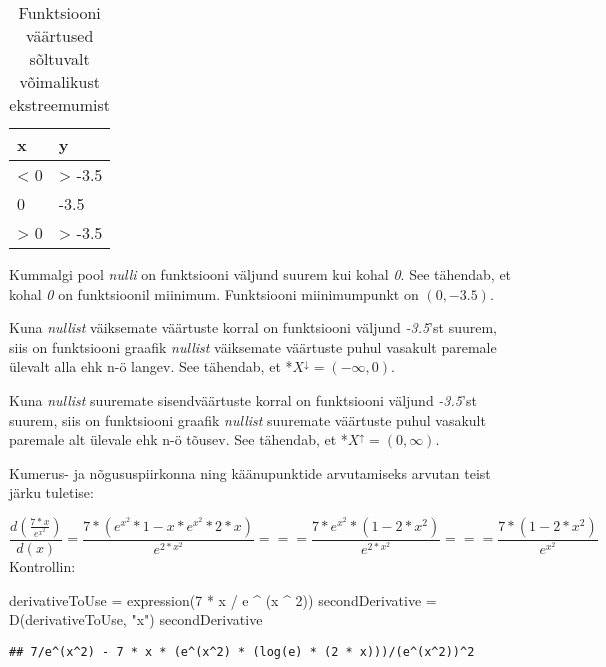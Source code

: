 \documentclass[
]{article}
\newenvironment{Shaded}{\begin{snugshade}}{\end{snugshade}}
\newcommand{\DecValTok}[1]{\textcolor[rgb]{0.00,0.00,0.81}{#1}}
\newcommand{\FunctionTok}[1]{\textcolor[rgb]{0.00,0.00,0.00}{#1}}
\newcommand{\NormalTok}[1]{#1}
\newcommand{\OtherTok}[1]{\textcolor[rgb]{0.56,0.35,0.01}{#1}}
\newcommand{\SpecialCharTok}[1]{\textcolor[rgb]{0.00,0.00,0.00}{#1}}
\newcommand{\StringTok}[1]{\textcolor[rgb]{0.31,0.60,0.02}{#1}}
\begin{document}
\begin{table}

\caption{\label{tab:unnamed-chunk-4}Funktsiooni väärtused sõltuvalt võimalikust ekstreemumist}
\centering
\begin{tabular}[t]{l|l}
\hline
x & y\\
\hline
< 0 & > -3.5\\
\hline
0 & -3.5\\
\hline
> 0 & > -3.5\\
\hline
\end{tabular}
\end{table}

Kummalgi pool \emph{nulli} on funktsiooni väljund suurem kui kohal \emph{0}. See tähendab, et kohal \emph{0} on funktsioonil miinimum. Funktsiooni miinimumpunkt on \((0, -3.5)\).

Kuna \emph{nullist} väiksemate väärtuste korral on funktsiooni väljund \emph{-3.5}'st suurem, siis on funktsiooni graafik \emph{nullist} väiksemate väärtuste puhul vasakult paremale ülevalt alla ehk n-ö langev. See tähendab, et *\(X ^ \downarrow = (-\infty, 0)\).

Kuna \emph{nullist} suuremate sisendväärtuste korral on funktsiooni väljund \emph{-3.5}'st suurem, siis on funktsiooni graafik \emph{nullist} suuremate väärtuste puhul vasakult paremale alt ülevale ehk n-ö tõusev. See tähendab, et *\(X ^ \uparrow = (0, \infty)\).

Kumerus- ja nõgususpiirkonna ning käänupunktide arvutamiseks arvutan teist järku tuletise:

\[\frac{d(\frac{7 * x}{e ^ {x ^ 2}})}{d(x)} = \frac{7 * (e ^ {x ^ 2} * 1 - x * e ^ {x ^ 2} * 2 * x)}{e ^ {2 * x ^ 2}} === \frac{7 * e ^ {x ^ 2} * (1 - 2 * x ^ 2)}{e ^ {2 * x ^ 2}} === \frac{7 * (1 - 2 * x ^ 2)}{e ^ {x ^ 2}}\]
Kontrollin:

\begin{Shaded}
\begin{Highlighting}[]
\NormalTok{derivativeToUse }\OtherTok{=} \FunctionTok{expression}\NormalTok{(}\DecValTok{7} \SpecialCharTok{*}\NormalTok{ x }\SpecialCharTok{/}\NormalTok{ e }\SpecialCharTok{\^{}}\NormalTok{ (x }\SpecialCharTok{\^{}} \DecValTok{2}\NormalTok{))}
\NormalTok{secondDerivative }\OtherTok{=} \FunctionTok{D}\NormalTok{(derivativeToUse, }\StringTok{"x"}\NormalTok{)}
\NormalTok{secondDerivative}
\end{Highlighting}
\end{Shaded}

\begin{verbatim}
## 7/e^(x^2) - 7 * x * (e^(x^2) * (log(e) * (2 * x)))/(e^(x^2))^2
\end{verbatim}
\end{document}
